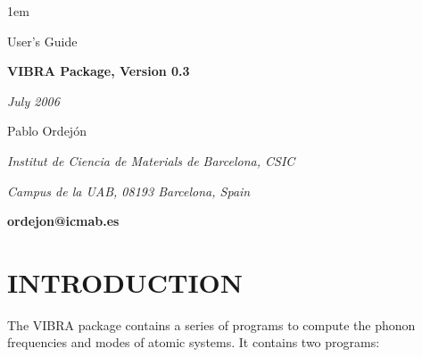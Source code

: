 %



\textheight 22cm
\textwidth 16cm
\oddsidemargin 1mm
\topmargin -15mm

\baselineskip=14pt
\parskip 5pt
\parindent 1em




\begin{titlepage}

\begin{center}

\vspace{1cm}

{\huge {\sc User's Guide}}

\vspace{3cm}

{\Huge {\bf VIBRA Package, Version 0.3}}

\vspace{3cm}

{\Large {\it July 2006}}

\vspace{3cm}

{\Large Pablo Ordej\'on}

\vspace{5pt}

{\it Institut de Ciencia de Materials de Barcelona, CSIC}

{\it Campus de la UAB, 08193 Barcelona, Spain}

\vspace{5pt}

{\bf ordejon@icmab.es}


\end{center}

\end{titlepage}


%



\section{INTRODUCTION}

\noindent
The VIBRA package contains a series of programs to compute the
phonon frequencies and modes of atomic systems. It contains two 
programs:

